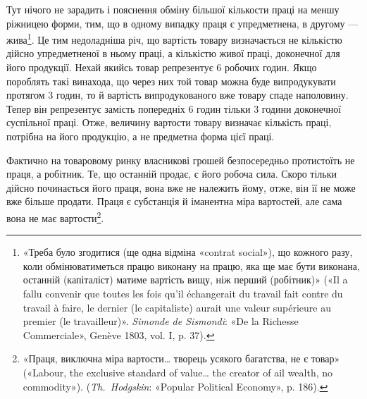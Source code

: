 
Тут нічого не зарадить і пояснення обміну більшої кількости
праці на меншу ріжницею форми, тим, що в одному випадку праця
є упредметнена, в другому — жива\footnote{
«Треба було згодитися (ще одна відміна «contrat social»), що кожного
разу, коли обмінюватиметься працю виконану на працю, яка ще
має бути виконана, останній (капіталіст) матиме вартість вищу, ніж перший
(робітник)» («Il a fallu convenir que toutes les fois qu’il échangerait du
travail fait contre du travail à faire, le dernier (le capitaliste) aurait une valeur
supérieure au premier (le travailleur)». \emph{Simonde de Sismondi}: «De
la Richesse Commerciale», Genève 1803, vol. I, p. 37).
}. Це тим недоладніша річ,
що вартість товару визначається не кількістю дійсно упредметненої
в ньому праці, а кількістю живої праці, доконечної для
його продукції. Нехай якийсь товар репрезентує 6 робочих годин.
Якщо пороблять такі винахода, що через них той товар можна
буде випродукувати протягом 3 годин, то й вартість випродукованого
вже товару спаде наполовину. Тепер він репрезентує
замість попередніх 6 годин тільки 3 години доконечної суспільної
праці. Отже, величину вартости товару визначає кількість праці,
потрібна на його продукцію, а не предметна форма цієї праці.

Фактично на товаровому ринку власникові грошей безпосередньо
протистоїть не праця, а робітник. Те, що останній продає,
є його робоча сила. Скоро тільки дійсно починається його
праця, вона вже не належить йому, отже, він її не може вже
більше продати. Праця є субстанція й іманентна міра вартостей,
але сама вона не має вартости\footnote{
«Праця, виключна міра вартости\dots{} творець усякого багатства,
не є товар» («Labour, the exclusive standard of value\dots{} the creator of
ail wealth, no commodity»). (\emph{Th.~Hodgskin}: «Popular Political Economy»,
p. 186).
}.

